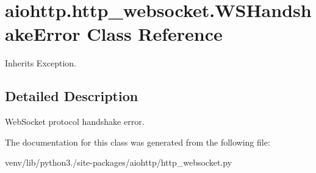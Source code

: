 \hypertarget{classaiohttp_1_1http__websocket_1_1_w_s_handshake_error}{}\section{aiohttp.\+http\+\_\+websocket.\+W\+S\+Handshake\+Error Class Reference}
\label{classaiohttp_1_1http__websocket_1_1_w_s_handshake_error}


Inherits Exception.



\subsection{Detailed Description}
\begin{DoxyVerb}WebSocket protocol handshake error.\end{DoxyVerb}
 

The documentation for this class was generated from the following file\+:\begin{DoxyCompactItemize}
\item 
venv/lib/python3./site-\/packages/aiohttp/http\+\_\+websocket.\+py\end{DoxyCompactItemize}
